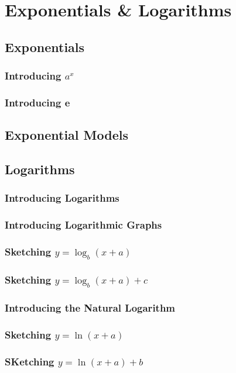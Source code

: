 \documentclass[../alevelmaths.tex]{subfiles}
\begin{document}
\chapter{Exponentials \& Logarithms}
\section{Exponentials}
\subsection*{Introducing \texorpdfstring{$a^x$}{a to the x}}
\subsection*{Introducing e}
\section{Exponential Models}
\section{Logarithms}
\subsection*{Introducing Logarithms}
\subsection*{Introducing Logarithmic Graphs}
\subsection*{Sketching \texorpdfstring{$y=\log_b(x+a)$}{ y = log of b(x+a)}}
\subsection*{Sketching \texorpdfstring{$y=\log_b(x+a)+c$}{y = log of b(x+a)+c}}
\subsection*{Introducing the Natural Logarithm}
\subsection*{Sketching \texorpdfstring{$y=\ln(x+a)$}{y = nautral log of (x+a)}}
\subsection*{SKetching \texorpdfstring{$y=\ln(x+a)+b$}{y = natural log of (x+a)+b}}
\end{document}
